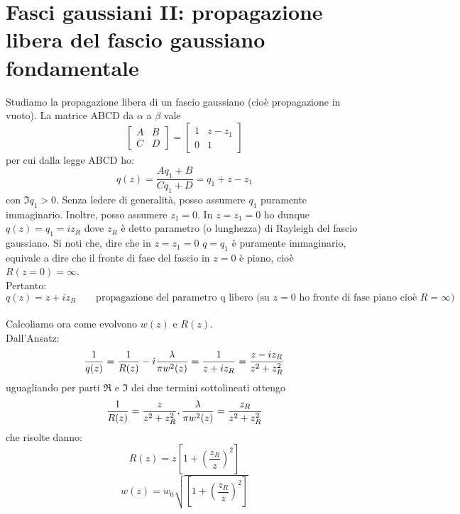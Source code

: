 \section{Fasci gaussiani II: propagazione libera del fascio gaussiano fondamentale}
Studiamo la propagazione libera di un fascio gaussiano (cioè propagazione in vuoto).
La matrice ABCD da $\alpha$ a $\beta$ vale
\[
\begin{bmatrix}
A	&	B\\
C	&	D
\end{bmatrix} =
\begin{bmatrix}
1	&	z - z_1\\
0	&	1
\end{bmatrix}
\]
per cui dalla legge ABCD ho:
\begin{equation*}
q(z) = \frac{Aq_1 + B}{Cq_1 + D} = q_1 + z - z_1
\end{equation*}
con $\Im{q_1} > 0$. Senza ledere di generalità, posso assumere $q_1$ puramente immaginario. Inoltre, posso assumere $z_1 = 0$. In $z = z_1 = 0$ ho dunque $q(z) = q_1 = iz_R$ dove $z_R$ è detto parametro (o lunghezza) di Rayleigh del fascio gaussiano. Si noti che, dire che in $z = z_1 = 0$ $q = q_1$ è puramente immaginario, equivale a dire che il fronte di fase del fascio in $z = 0$ è piano, cioè $R(z=0) = \infty$.\\
Pertanto:
\begin{equation*}
q(z) = z + iz_R \qquad \text{propagazione del parametro q libero (su $z=0$ ho fronte di fase piano cioè $R=\infty$)}
\end{equation*}
\\
Calcoliamo ora come evolvono $w(z)$ e $R(z)$.\\
Dall'Ansatz:
\begin{equation*}
\frac{1}{q(z)} = \frac{1}{R(z)} -i\frac{\lambda}{\pi w^2(z)} = \frac{1}{z + iz_R} = \frac{z - iz_R}{z^2 + z_R^2}
\end{equation*}
uguagliando per parti $\Re$ e $\Im$ dei due termini sottolineati ottengo
\begin{equation*}
\frac{1}{R(z)} = \frac{z}{z^2 + z_R^2} , \frac{\lambda}{\pi w^2(z)} = \frac{z_R}{z^2 + z_R^2}
\end{equation*}
che risolte danno:
\begin{equation*}
R(z) = z \left[1 + \left(\frac{z_R}{z} \right)^2 \right]
\end{equation*}
\begin{equation*}
w(z) = w_0 \sqrt{\left[1 + \left(\frac{z_R}{z} \right)^2 \right]}
\end{equation*}
